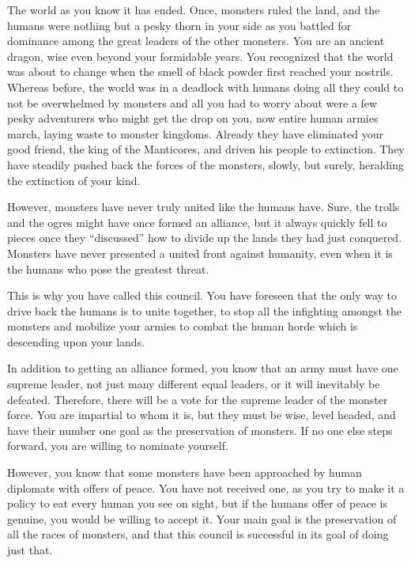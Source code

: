 \documentclass[char]{guildcamp2}
\begin{document}
\name{\cOnyx{}}


	The world as you know it has ended. Once, monsters ruled the land, and the humans were nothing but a pesky thorn in your side as you battled for dominance among the great leaders of the other monsters. You are an ancient dragon, wise even beyond your formidable years. You recognized that the world was about to change when the smell of black powder first reached your nostrils. Whereas before, the world was in a deadlock with humans doing all they could to not be overwhelmed by monsters and all you had to worry about were a few pesky adventurers who might get the drop on you, now entire human armies march, laying waste to monster kingdoms. Already they have eliminated your good friend, the king of the Manticores, and driven his people to extinction. They have steadily pushed back the forces of the monsters, slowly, but surely, heralding the extinction of your kind. 
	
	However, monsters have never truly united like the humans have. Sure, the trolls and the ogres might have once formed an alliance, but it always quickly fell to pieces once they ``discussed'' how to divide up the lands they had just conquered. Monsters have never presented a united front against humanity, even when it is the humans who pose the greatest threat. 
	
	This is why you have called this council. You have foreseen that the only way to drive back the humans is to unite together, to stop all the infighting amongst the monsters and mobilize your armies to combat the human horde which is descending upon your lands.  
	
	In addition to getting an alliance formed, you  know that an army must have one supreme leader, not just many different equal leaders, or it will inevitably be defeated. Therefore, there will be a vote for the supreme leader of the monster force. You are impartial to whom it is, but they must be wise, level headed, and have their number one goal as the preservation of monsters. If no one else steps forward, you are willing to nominate yourself.
	
	However, you know that some monsters have been approached by human diplomats with offers of peace. You have not received one, as you try to make it a policy to eat every human you see on sight, but if the humans offer of peace is genuine, you would be willing to accept it. Your main goal is the preservation of all the races of monsters, and that this council is successful in its goal of doing just that.
	
\end{document}
